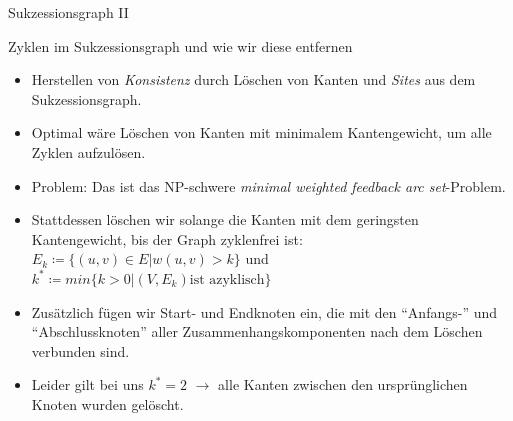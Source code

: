 \documentclass[wide,xcolor={x11names},hyperref={colorlinks=false},pantone312]{beamer}
\begin{document}
\begin{frame}[t]{Sukzessionsgraph II}
\begin{center}
	\end{center}
\end{frame}

\begin{frame}[t]{Zyklen im Sukzessionsgraph und wie wir diese entfernen}
	\begin{itemize}
		\item Herstellen von \emph{Konsistenz} durch Löschen von Kanten und \emph{Sites} aus dem Sukzessionsgraph. \cite{PDC10}
		\item Optimal wäre Löschen von Kanten mit minimalem Kantengewicht, um alle Zyklen aufzulösen.
		\item Problem: \pause Das ist das NP-schwere \emph{minimal weighted feedback arc set}-Problem. \pause
		\item Stattdessen löschen wir solange die Kanten mit dem geringsten Kantengewicht, bis der Graph zyklenfrei ist: \\
		$E_k \coloneqq \{(u,v) \in E | w(u,v) > k\}$ und $k^* \coloneqq min\{k>0 | (V, E_k) \mbox{ist azyklisch}\}$ \
		\item Zusätzlich fügen wir Start- und Endknoten ein, die mit den \enquote{Anfangs-} und \enquote{Abschlussknoten} aller Zusammenhangskomponenten nach dem Löschen verbunden sind. \pause
		\item Leider gilt bei uns $k^* = 2$ $\rightarrow$ alle Kanten zwischen den ursprünglichen Knoten wurden gelöscht.
	\end{itemize}
\end{frame}
\end{document}
